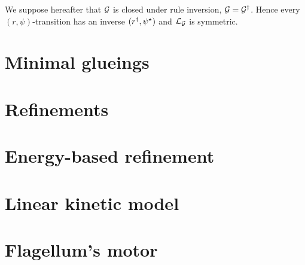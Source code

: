 We suppose hereafter that $\mathcal{G}$ is closed under
rule inversion, \ie $\mathcal{G} = \mathcal{G}^\dagger$.
Hence every $(r,\psi)$-transition
has an inverse $(r^\dagger,\psi^\star)$
and $\mathcal{L}_{\mathcal{G}}$ is symmetric.


\section{Minimal glueings}
\label{sec:mg}


\section{Refinements} %
\label{sec:gp}
\fi


\section{Energy-based refinement}
\label{sec:energy-gp}


\section{Linear kinetic model}
\label{sec:kinetic-model}

%
%


\section{Flagellum's motor}
\label{sec:alloring}




